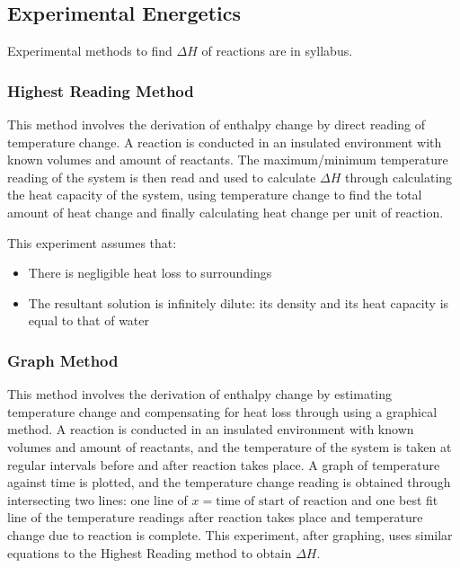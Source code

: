 \documentclass[../main]{subfiles}
\begin{document}
	\subsection{Experimental Energetics}

	Experimental methods to find \(\Delta H\) of reactions are in syllabus.

	\subsubsection{Highest Reading Method}

	This method involves the derivation of enthalpy change by direct reading of temperature change. A reaction is conducted in an insulated environment with known volumes and amount of reactants. The maximum/minimum temperature reading of the system is then read and used to calculate \(\Delta H\) through calculating the heat capacity of the system, using temperature change to find the total amount of heat change and finally calculating heat change per unit of reaction. \\


	This experiment assumes that:
	\begin{itemize}
		\item There is negligible heat loss to surroundings
		\item The resultant solution is infinitely dilute: its density and its heat capacity  is equal to that of water
	\end{itemize}

	\subsubsection{Graph Method}

	This method involves the derivation of enthalpy change by estimating temperature change and compensating for heat loss through using a graphical method. A reaction is conducted in an insulated environment with known volumes and amount of reactants, and the temperature of the system is taken at regular intervals before and after reaction takes place. A graph of temperature against time is plotted, and the temperature change reading is obtained through intersecting two lines: one line of \(x = \text{time of start of reaction}\) and one best fit line of the temperature readings after reaction takes place and temperature change due to reaction is complete. This experiment, after graphing, uses similar equations to the Highest Reading method to obtain \(\Delta H\).\\
\end{document}
